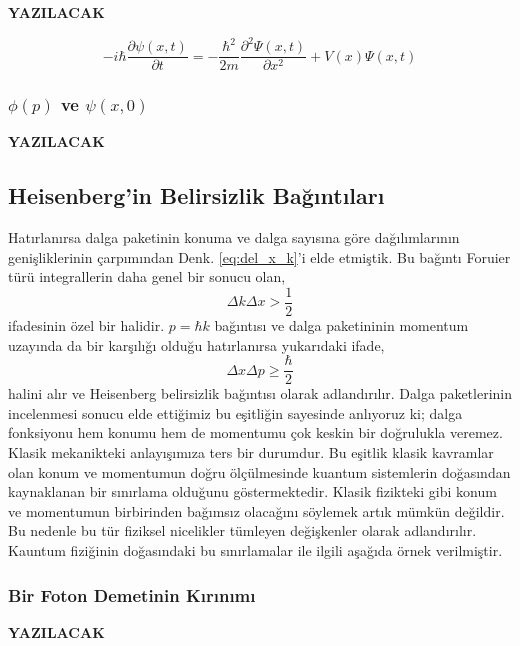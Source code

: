 \documentclass[a4paper,12pt, twoside]{article}
\newcommand{\YAZILACAK}{{\vspace{18pt}\bf\Large \color{red} YAZILACAK}}
\begin{document}
\YAZILACAK

\begin{equation}
-i\hbar \dfrac {\partial \psi \left( x,t\right) }{\partial t}=-\dfrac {\hbar ^{2}}{2m}\dfrac {\partial ^{2}\Psi \left( x,t\right) }{\partial x^{2}}+V\left( x\right) \Psi \left( x,t\right)
\label{eq:schrodinger_eq}
\end{equation}


\subsubsection{$\phi \left( p\right)$  ve $\psi \left( x,0\right) $}
\YAZILACAK

\subsection{Heisenberg'in Belirsizlik Bağıntıları}

Hatırlanırsa dalga paketinin konuma ve dalga sayısına göre dağılımlarının genişliklerinin çarpımından Denk. \ref{eq:del_x_k}'i elde etmiştik. Bu bağıntı Foruier türü integrallerin daha genel bir sonucu olan,
\begin{equation}
\Delta k\Delta x >\dfrac {1}{2}
\end{equation}
ifadesinin özel bir halidir. $p = \hbar k$ bağıntısı ve dalga paketininin momentum uzayında da bir karşılığı olduğu hatırlanırsa yukarıdaki ifade,
\begin{equation}
\Delta x \Delta p \geq\dfrac {\hbar}{2}
\label{eq:heisenberg_uncertainty}
\end{equation}
halini alır ve Heisenberg belirsizlik bağıntısı olarak adlandırılır. Dalga paketlerinin incelenmesi sonucu elde ettiğimiz bu eşitliğin sayesinde anlıyoruz ki; dalga fonksiyonu hem konumu hem de momentumu çok keskin bir doğrulukla veremez. Klasik mekanikteki anlayışımıza ters bir durumdur. Bu eşitlik klasik kavramlar olan konum ve momentumun doğru ölçülmesinde kuantum sistemlerin doğasından kaynaklanan bir sınırlama olduğunu göstermektedir. Klasik fizikteki gibi konum ve momentumun birbirinden bağımsız olacağını söylemek artık mümkün değildir. Bu nedenle bu tür fiziksel nicelikler tümleyen değişkenler olarak adlandırılır.  Kauntum fiziğinin doğasındaki bu sınırlamalar ile ilgili aşağıda örnek verilmiştir.  

\subsubsection{Bir Foton Demetinin Kırınımı}
\YAZILACAK
\end{document}
